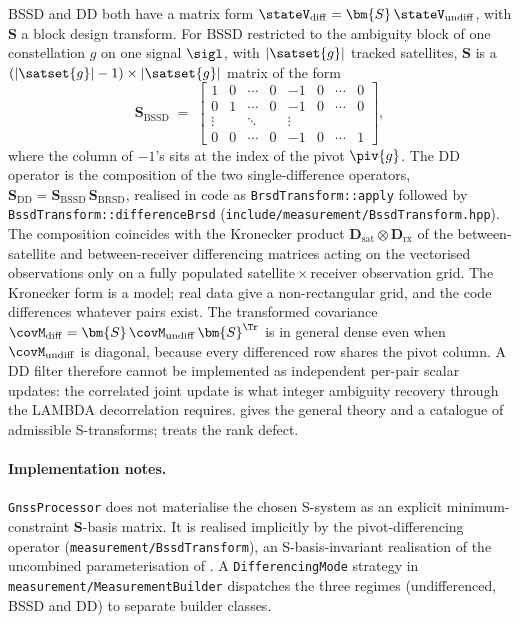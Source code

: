 BSSD and DD both have a matrix form
$\stateV_{\mathrm{diff}} = \bm{S}\,\stateV_{\mathrm{undiff}}$, with
$\bm{S}$ a block design transform.  For BSSD restricted to the ambiguity block of one
constellation $g$ on one signal $\sigl$, with $|\satset{g}|$ tracked satellites,
$\bm{S}$ is a
$(|\satset{g}|-1) \times |\satset{g}|$ matrix of the form
\begin{equation}
\bm{S}_{\mathrm{BSSD}}
\;=\;
\begin{bmatrix}
1 & 0 & \cdots & 0 & -1 & 0 & \cdots & 0 \\
0 & 1 & \cdots & 0 & -1 & 0 & \cdots & 0 \\
\vdots & & \ddots & & \vdots & & \\
0 & 0 & \cdots & 0 & -1 & 0 & \cdots & 1
\end{bmatrix},
\end{equation}
where the column of $-1$'s sits at the index of the pivot $\piv{g}$.  The DD
operator is the composition of the two single-difference operators,
$\bm{S}_{\mathrm{DD}} = \bm{S}_{\mathrm{BSSD}}\,\bm{S}_{\mathrm{BRSD}}$, realised in
code as \texttt{BrsdTransform::apply} followed by
\texttt{BssdTransform::differenceBrsd}
(\texttt{include/measurement/BssdTransform.hpp}).  The composition coincides with the
Kronecker product $\mathbf{D}_{\mathrm{sat}} \otimes \mathbf{D}_{\mathrm{rx}}$ of the
between-satellite and between-receiver differencing matrices acting on the vectorised
observations only on a fully populated satellite\,$\times$\,receiver observation
grid.  The Kronecker form is a model; real data give a non-rectangular grid, and the
code differences whatever pairs exist.  The transformed covariance
$\covM_{\mathrm{diff}} = \bm{S}\,\covM_{\mathrm{undiff}}\,\bm{S}^{\Tr}$ is in general
dense even when $\covM_{\mathrm{undiff}}$ is diagonal, because every differenced row
shares the pivot column.  A DD filter therefore cannot be implemented as independent
per-pair scalar updates: the correlated joint update is what integer ambiguity
recovery through the LAMBDA decorrelation requires.
\textcite{teunissen1985generalised} gives the general theory and a catalogue of
admissible S-transforms; \textcite{deJonge1998processing} treats the rank defect.

\paragraph{Implementation notes.}
\texttt{GnssProcessor} does not materialise the chosen S-system as an explicit
minimum-constraint $\bm{S}$-basis matrix.  It is realised implicitly by the pivot-differencing operator
(\texttt{measurement/BssdTransform}), an S-basis-invariant realisation of the
uncombined parameterisation of \textcite{odijk2003fast}.  A
\texttt{DifferencingMode} strategy in \texttt{measurement/MeasurementBuilder}
dispatches the three regimes (undifferenced, BSSD and DD) to separate builder
classes.

